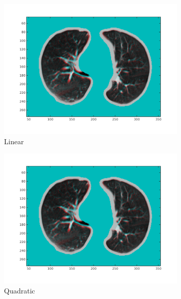 \documentclass[11pt,a4paper,oneside]{report}
\begin{document}
\begin{figure}
  \centering
  \hspace*{-2em}
  \begin{subfigure}[b]{0.33\textwidth}
    \includegraphics[width=\textwidth, trim=0 50 0 0,clip=true]{figures/task4/visAss_m1.png}
    \caption{Linear}
  \end{subfigure}%
  \begin{subfigure}[b]{0.33\textwidth}
    \includegraphics[width=\textwidth, trim=0 50 0 0,clip=true]{figures/task4/visAss_m1.png}
    \caption{Quadratic}
  \end{subfigure}
  \begin{subfigure}[b]{0.33\textwidth}

\end{subfigure}
\end{figure}
\end{document}
